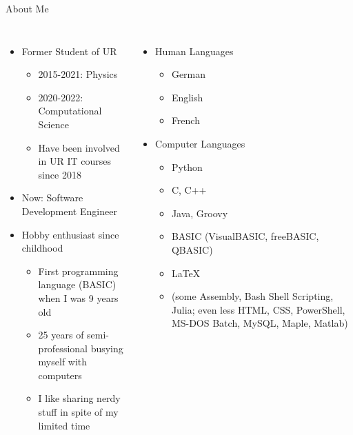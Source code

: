 
\begin{frame}[t,plain]
\titlepage
\end{frame}


\begin{frame}{About Me}
%
\begin{columns}[T]
\begin{itemize}
\item Former Student of UR
	\begin{itemize}
	\item 2015-2021: Physics
	\item 2020-2022: Computational Science
	\item Have been involved in UR IT courses since 2018
	\end{itemize}
\item Now: Software Development Engineer
\item Hobby enthusiast since childhood
	\begin{itemize}
	\item First programming language (BASIC) when I was 9 years old
	\item 25 years of semi-professional busying myself with computers
	\item I like sharing nerdy stuff in spite of my limited time
	\end{itemize}
\end{itemize}
%
\begin{itemize}
\item Human Languages
	\begin{itemize}
	\item German
	\item English
	\item French
	\end{itemize}
\item Computer Languages
	\begin{itemize}
	\item Python
	\item C, C++
	\item Java, Groovy
	\item BASIC (VisualBASIC, freeBASIC, QBASIC)
	\item \LaTeX
	\item (some Assembly, Bash Shell Scripting, Julia; even less HTML, CSS, PowerShell, MS-DOS Batch, MySQL, Maple, Matlab)
	\end{itemize}
\end{itemize}
\end{columns}
%
\end{frame}

